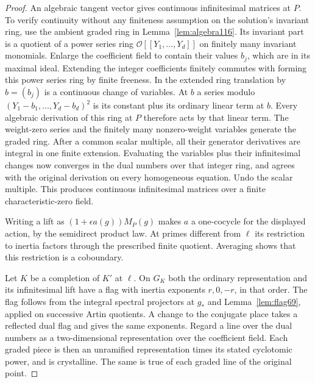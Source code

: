 \documentclass[a4paper,11pt]{article}
\theoremstyle{definition}
\theoremstyle{remark}
\numberwithin{equation}{section}
\newcommand{\OO}{\mathcal O}
\begin{document}
\begin{proof}
An algebraic tangent vector gives continuous infinitesimal
matrices at \(P\). To verify continuity without any finiteness
assumption on the solution's invariant ring, use the ambient
graded ring in Lemma~\ref{lem:algebra116}. Its invariant part
is a quotient of a power series ring \(\OO[[Y_1,\ldots,Y_d]]\)
on finitely many invariant monomials. Enlarge the coefficient
field to contain their values \(b_j\), which are in its maximal
ideal. Extending the integer coefficients finitely commutes
with forming this power series ring by finite freeness. In
the extended ring translation by \(b=(b_j)\) is a continuous
change of variables. At \(b\) a series modulo
\((Y_1-b_1,\ldots,Y_d-b_d)^2\) is its constant plus its
ordinary linear term at \(b\). Every algebraic derivation of
this ring at \(P\) therefore acts by that linear term. The
weight-zero series and the finitely many nonzero-weight
variables generate the graded ring. After a common scalar
multiple, all their generator derivatives are integral in
one finite extension. Evaluating the variables plus their
infinitesimal changes now converges in the dual numbers over
that integer ring, and agrees with the original derivation on
every homogeneous equation. Undo the scalar multiple. This
produces continuous infinitesimal matrices over a finite
characteristic-zero field.

Writing a lift as \((1+\epsilon a(g))M_P(g)\) makes \(a\) a
one-cocycle for the displayed action, by the semidirect
product law. At primes different from \(\ell\) its restriction
to inertia factors through the prescribed finite quotient.
Averaging shows that this restriction is a coboundary.

Let \(K\) be a completion of \(K'\) at \(\ell\). On \(G_K\)
both the ordinary representation and its infinitesimal lift
have a flag with inertia exponents \(r,0,-r\), in that order.
The flag follows from the integral spectral projectors at
\(g_*\) and Lemma~\ref{lem:flag69}, applied on successive
Artin quotients. A change to the conjugate place takes a
reflected dual flag and gives the same exponents. Regard a
line over the dual numbers as a two-dimensional representation
over the coefficient field. Each graded piece is then an
unramified representation times its stated cyclotomic power,
and is crystalline. The same is true of each graded line of
the original point.


\end{proof}
\end{document}
